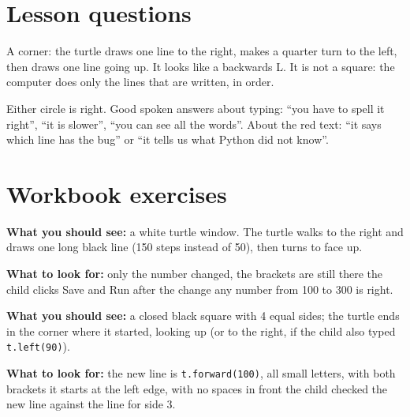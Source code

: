 
\section{Lesson questions}
\begin{answer}
A corner: the turtle draws one line to the right, makes a quarter turn to the left, then draws one line going up. It looks like a backwards L. It is not a square: the computer does only the lines that are written, in order.
\end{answer}

\begin{answer}[Reflection]
Either circle is right. Good spoken answers about typing: \enquote{you have to spell it right}, \enquote{it is slower}, \enquote{you can see all the words}. About the red text: \enquote{it says which line has the bug} or \enquote{it tells us what Python did not know}.
\end{answer}

\section{Workbook exercises}
\begin{answer}
\textbf{What you should see:} a white turtle window. The turtle walks to the right and draws one long black line (150 steps instead of 50), then turns to face up.

\textbf{What to look for:} \tickbox{} only the number changed, the brackets are still there \quad \tickbox{} the child clicks Save and Run after the change \quad \tickbox{} any number from 100 to 300 is right.
\end{answer}

\begin{answer}
\textbf{What you should see:} a closed black square with 4 equal sides; the turtle ends in the corner where it started, looking up (or to the right, if the child also typed \texttt{t.left(90)}).

\textbf{What to look for:} \tickbox{} the new line is \texttt{t.forward(100)}, all small letters, with both brackets \quad \tickbox{} it starts at the left edge, with no spaces in front \quad \tickbox{} the child checked the new line against the line for side 3.
\end{answer}

